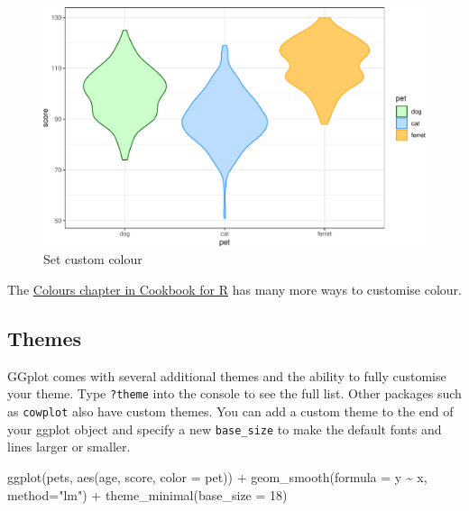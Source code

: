 \documentclass[
  oneside]{book}
\newenvironment{Shaded}{\begin{snugshade}}{\end{snugshade}}
\newcommand{\AttributeTok}[1]{\textcolor[rgb]{0.77,0.63,0.00}{#1}}
\newcommand{\DecValTok}[1]{\textcolor[rgb]{0.00,0.00,0.81}{#1}}
\newcommand{\FunctionTok}[1]{\textcolor[rgb]{0.00,0.00,0.00}{#1}}
\newcommand{\NormalTok}[1]{#1}
\newcommand{\SpecialCharTok}[1]{\textcolor[rgb]{0.00,0.00,0.00}{#1}}
\newcommand{\StringTok}[1]{\textcolor[rgb]{0.31,0.60,0.02}{#1}}
\begin{document}
\begin{figure}

{\centering \includegraphics[width=0.9\linewidth]{images/line-labels-1} 

}

\caption{Set custom colour}\label{fig:line-labels}
\end{figure}

The \href{http://www.cookbook-r.com/Graphs/Colors_(ggplot2)/}{Colours chapter in Cookbook for R} has many more ways to customise colour.

\hypertarget{themes}{%
\subsection{Themes}\label{themes}}

GGplot comes with several additional themes and the ability to fully customise your theme. Type \texttt{?theme} into the console to see the full list. Other packages such as \texttt{cowplot} also have custom themes. You can add a custom theme to the end of your ggplot object and specify a new \texttt{base\_size} to make the default fonts and lines larger or smaller.

\begin{Shaded}
\begin{Highlighting}[]
\FunctionTok{ggplot}\NormalTok{(pets, }\FunctionTok{aes}\NormalTok{(age, score, }\AttributeTok{color =}\NormalTok{ pet)) }\SpecialCharTok{+}
  \FunctionTok{geom\_smooth}\NormalTok{(}\AttributeTok{formula =}\NormalTok{ y }\SpecialCharTok{\textasciitilde{}}\NormalTok{ x, }\AttributeTok{method=}\StringTok{"lm"}\NormalTok{) }\SpecialCharTok{+}
  \FunctionTok{theme\_minimal}\NormalTok{(}\AttributeTok{base\_size =} \DecValTok{18}\NormalTok{)}
\end{Highlighting}
\end{Shaded}
\end{document}
